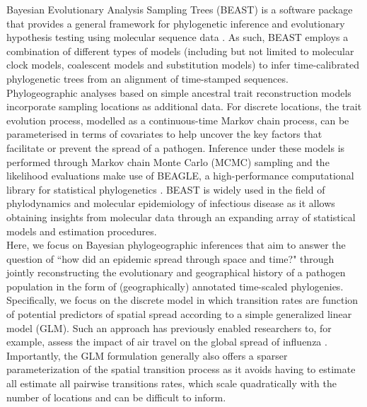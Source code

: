 \documentclass{article}
\begin{document}
Bayesian Evolutionary Analysis Sampling Trees (BEAST) \cite{beast110} is a software package that provides a general framework for phylogenetic inference and evolutionary hypothesis testing using molecular sequence data \cite{beastOG,beast17,beast110}.
As such, BEAST employs a combination of different types of models (including but not limited to molecular clock models, coalescent models and substitution models) to infer time-calibrated phylogenetic trees from an alignment of time-stamped sequences.
Phylogeographic analyses based on simple ancestral trait reconstruction models incorporate sampling locations as additional data.
For discrete locations, the trait evolution process, modelled as a continuous-time Markov chain process, can be parameterised in terms of covariates to help uncover the key factors that facilitate or prevent the spread of a pathogen.
Inference under these models is performed through Markov chain Monte Carlo (MCMC) sampling and the likelihood evaluations make use of BEAGLE, a high-performance computational library for statistical phylogenetics \cite{beagle3}.
BEAST is widely used in the field of phylodynamics and molecular epidemiology of infectious disease as it allows obtaining insights from molecular data through an expanding array of statistical models and estimation procedures. \\

Here, we focus on Bayesian phylogeographic inferences that aim to answer the question of ``how did an epidemic spread through space and time?" through jointly reconstructing the evolutionary and geographical history of a pathogen population in the form of (geographically) annotated time-scaled phylogenies.
Specifically, we focus on the discrete model in which transition rates are function of potential predictors of spatial spread according to a simple generalized linear model (GLM).
Such an approach has previously enabled researchers to, for example, assess the impact of air travel on the global spread of influenza \cite{glm}. 
Importantly, the GLM formulation generally also offers a sparser parameterization of the spatial transition process as it avoids having to estimate all estimate all pairwise transitions rates, which scale quadratically with the number of locations and can be difficult to inform. \\
\end{document}
